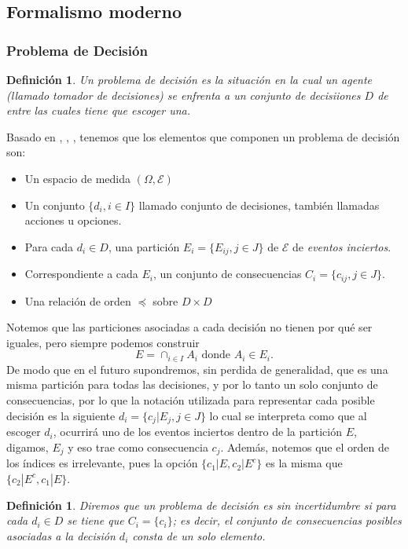 \documentclass[11pt]{article}
\theoremstyle{plain}
\newtheorem{defi}[teo]{Definición}
\begin{document}
\subsection{Formalismo moderno}
\subsubsection{Problema de Decisión}
\begin{defi}
Un problema de decisión es la situación en la cual un agente (llamado tomador de decisiones) se enfrenta a un conjunto de decisiiones $D$ de entre las cuales tiene que escoger una.
\end{defi}
Basado en \cite{Bernardo1985}, \cite{bernardo2000bayesian}, \cite{gilboa2009decision}, tenemos que los elementos que componen un problema de decisión son:
\begin{itemize}
\item Un espacio de medida $(\Omega, \mathcal{E})$
\item Un conjunto $\{d_i, i \in I\}$ llamado conjunto de decisiones, también llamadas acciones u opciones.
\item Para cada $d_i \in D$, una partición $E_i= \{E_{ij}, j \in J \}$ de $\mathcal{E}$ de \textit{eventos inciertos}.
\item Correspondiente a cada $E_i$, un conjunto de consecuencias $C_i = \{ c_{ij}, j \in J \}$.
\item Una relación de orden $\preceq$ sobre $D \times D$
\end{itemize}
Notemos que las particiones asociadas a cada decisión no tienen por qué ser iguales, pero siempre podemos construir
\[ E = \cap_{i \in I} A_i \textrm{ donde } A_i \in E_i. \]
De modo que en el futuro supondremos, sin perdida de generalidad, que es una misma partición para todas las decisiones, y por lo tanto un solo conjunto de consecuencias, por lo que la notación utilizada para representar cada posible decisión es la siguiente $d_i = \{ c_j | E_j, j \in J\}$ lo cual se interpreta como que al escoger $d_i$, ocurrirá uno de los eventos inciertos dentro de la partición $E$, digamos, $E_j$ y eso trae como consecuencia $c_j$. Además, notemos que el orden de los índices es irrelevante, pues la opción $\{ c_1 | E, c_2 | E^c \}$ es la misma que $\{ c_2 | E^c, c_1 | E \}$.
\begin{defi}
Diremos que un problema de decisión es sin incertidumbre si para cada $d_i \in D$ se tiene que $C_i = \{c_i\}$; es decir,  el conjunto de consecuencias posibles  asociadas a la decisión $d_i$ consta de un solo elemento.
\end{defi}
\end{document}
